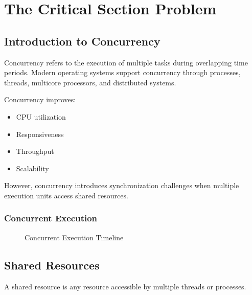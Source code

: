 \chapter{The Critical Section Problem}

\section{Introduction to Concurrency}

Concurrency refers to the execution of multiple tasks during overlapping time periods. Modern operating systems support concurrency through processes, threads, multicore processors, and distributed systems.

Concurrency improves:

\begin{itemize}
\item CPU utilization
\item Responsiveness
\item Throughput
\item Scalability
\end{itemize}

However, concurrency introduces synchronization challenges when multiple execution units access shared resources.

\subsection{Concurrent Execution}

\begin{figure}[H]
\centering
{}
\caption{Concurrent Execution Timeline}
\end{figure}

\section{Shared Resources}

A shared resource is any resource accessible by multiple threads or processes.

